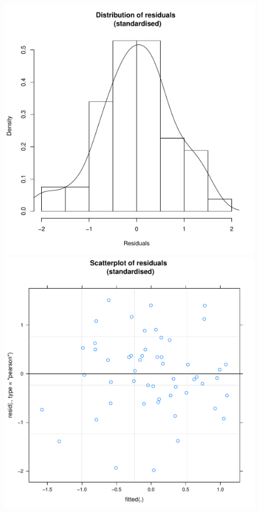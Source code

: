 \begin{CJK}{UTF8}{gbsn}


\begin{figure}[htbp]

\includegraphics[scale =.4]{images/TEM21Hist.pdf}
   \includegraphics[scale =.4]{images/TEM21Scatter.pdf}

\end{figure}
\end{CJK}

